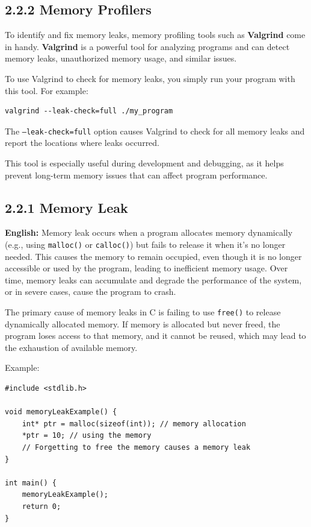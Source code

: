 \documentclass{article}
\begin{document}
\subsection*{2.2.2 Memory Profilers}
To identify and fix memory leaks, memory profiling tools such as \textbf{Valgrind} come in handy. \textbf{Valgrind} is a powerful tool for analyzing programs and can detect memory leaks, unauthorized memory usage, and similar issues.

To use Valgrind to check for memory leaks, you simply run your program with this tool. For example:
\begin{verbatim}
valgrind --leak-check=full ./my_program
\end{verbatim}
The \texttt{--leak-check=full} option causes Valgrind to check for all memory leaks and report the locations where leaks occurred.

This tool is especially useful during development and debugging, as it helps prevent long-term memory issues that can affect program performance.






\subsection*{2.2.1 Memory Leak}
\textbf{English:} 
Memory leak occurs when a program allocates memory dynamically (e.g., using \texttt{malloc()} or \texttt{calloc()}) but fails to release it when it's no longer needed. This causes the memory to remain occupied, even though it is no longer accessible or used by the program, leading to inefficient memory usage. Over time, memory leaks can accumulate and degrade the performance of the system, or in severe cases, cause the program to crash.

The primary cause of memory leaks in C is failing to use \texttt{free()} to release dynamically allocated memory. If memory is allocated but never freed, the program loses access to that memory, and it cannot be reused, which may lead to the exhaustion of available memory.

Example:
\begin{verbatim}
#include <stdlib.h>

void memoryLeakExample() {
    int* ptr = malloc(sizeof(int)); // memory allocation
    *ptr = 10; // using the memory
    // Forgetting to free the memory causes a memory leak
}

int main() {
    memoryLeakExample();
    return 0;
}
\end{verbatim}
\end{document}
